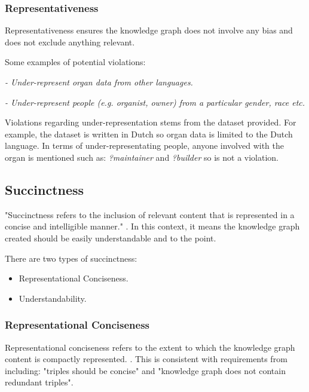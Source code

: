 \subsubsection{Representativeness}
\hspace{0.5cm} Representativeness ensures the knowledge graph does not involve any bias and does not exclude anything relevant. \cite{knowledgegraphevaulationbook}

\noindent Some examples of potential violations: 

\vspace{-0.05cm}
\begin{displayquote}
    \textit{- Under-represent organ data from other languages.}
\end{displayquote}  
\vspace{-0.4cm}
\begin{displayquote}
     \textit{- Under-represent people (e.g. organist, owner) from a particular gender, race etc. }  
\end{displayquote}

Violations regarding under-representation stems from the dataset provided. For example, the dataset is written in Dutch so organ data is limited to the Dutch language. In terms of under-representating people, anyone involved with the organ is mentioned such as: \textit{?maintainer} and \textit{?builder} so is not a violation. 

\subsection{Succinctness}
\hspace{0.5cm} "Succinctness refers to the inclusion of relevant content that is represented in a concise and intelligible manner." \cite{knowledgegraphevaulationbook}. In this context, it means the knowledge graph created should be easily understandable and to the point. 

\noindent There are two types of succinctness: 

\vspace{-0.1cm}
\begin{itemize}
    \itemsep0em 
\item Representational Conciseness.
\vspace{-0.1cm}
\item Understandability.
\end{itemize}
\vspace{-0.4cm}

\subsubsection{Representational Conciseness}
\hspace{0.5cm} Representational conciseness refers to the extent to which the knowledge graph content is compactly represented. \cite{knowledgegraphevaulationbook}. This is consistent with requirements from \cite{evaluationpaper} including: "triples should be concise" and "knowledge graph does not contain redundant triples".


